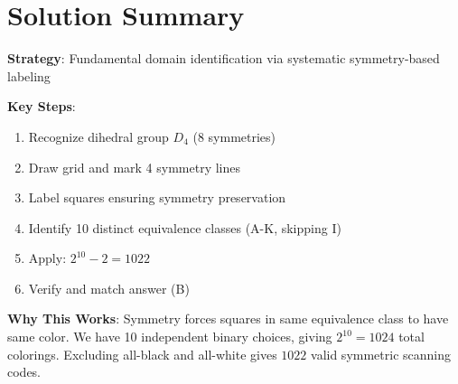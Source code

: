 \documentclass[]{article}
\begin{document}
\section*{Solution Summary}

\textbf{Strategy}: Fundamental domain identification via systematic symmetry-based labeling

\textbf{Key Steps}:
\begin{enumerate}
    \item Recognize dihedral group $D_4$ (8 symmetries)
    \item Draw grid and mark 4 symmetry lines
    \item Label squares ensuring symmetry preservation
    \item Identify 10 distinct equivalence classes (A-K, skipping I)
    \item Apply: $2^{10} - 2 = 1022$
    \item Verify and match answer (B)
\end{enumerate}

\textbf{Why This Works}: Symmetry forces squares in same equivalence class to have same color. We have 10 independent binary choices, giving $2^{10} = 1024$ total colorings. Excluding all-black and all-white gives $\boxed{1022}$ valid symmetric scanning codes.
\end{document}
